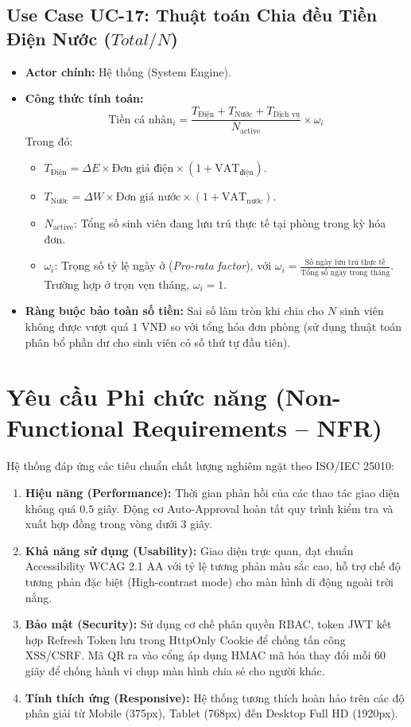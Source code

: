 \subsection{Use Case UC-17: Thuật toán Chia đều Tiền Điện Nước ($Total / N$)}
\begin{itemize}
    \item \textbf{Actor chính:} Hệ thống (System Engine).
    \item \textbf{Công thức tính toán:}
    \begin{equation}
        \text{Tiền cá nhân}_i = \frac{T_{\text{Điện}} + T_{\text{Nước}} + T_{\text{Dịch vụ}}}{N_{\text{active}}} \times \omega_i
    \end{equation}
    Trong đó:
    \begin{itemize}
        \item $T_{\text{Điện}} = \Delta E \times \text{Đơn giá điện} \times (1 + \text{VAT}_{\text{điện}})$.
        \item $T_{\text{Nước}} = \Delta W \times \text{Đơn giá nước} \times (1 + \text{VAT}_{\text{nước}})$.
        \item $N_{\text{active}}$: Tổng số sinh viên đang lưu trú thực tế tại phòng trong kỳ hóa đơn.
        \item $\omega_i$: Trọng số tỷ lệ ngày ở (\textit{Pro-rata factor}), với $\omega_i = \frac{\text{Số ngày lưu trú thực tế}}{\text{Tổng số ngày trong tháng}}$. Trường hợp ở trọn vẹn tháng, $\omega_i = 1$.
    \end{itemize}
    \item \textbf{Ràng buộc bảo toàn số tiền:} Sai số làm tròn khi chia cho $N$ sinh viên không được vượt quá $1$ VNĐ so với tổng hóa đơn phòng (sử dụng thuật toán phân bổ phần dư cho sinh viên có số thứ tự đầu tiên).
\end{itemize}

\section{Yêu cầu Phi chức năng (Non-Functional Requirements -- NFR)}
Hệ thống đáp ứng các tiêu chuẩn chất lượng nghiêm ngặt theo ISO/IEC 25010:
\begin{enumerate}
    \item \textbf{Hiệu năng (Performance):} Thời gian phản hồi của các thao tác giao diện không quá $0.5$ giây. Động cơ Auto-Approval hoàn tất quy trình kiểm tra và xuất hợp đồng trong vòng dưới $3$ giây.
    \item \textbf{Khả năng sử dụng (Usability):} Giao diện trực quan, đạt chuẩn Accessibility WCAG 2.1 AA với tỷ lệ tương phản màu sắc cao, hỗ trợ chế độ tương phản đặc biệt (High-contrast mode) cho màn hình di động ngoài trời nắng.
    \item \textbf{Bảo mật (Security):} Sử dụng cơ chế phân quyền RBAC, token JWT kết hợp Refresh Token lưu trong HttpOnly Cookie để chống tấn công XSS/CSRF. Mã QR ra vào cổng áp dụng HMAC mã hóa thay đổi mỗi 60 giây để chống hành vi chụp màn hình chia sẻ cho người khác.
    \item \textbf{Tính thích ứng (Responsive):} Hệ thống tương thích hoàn hảo trên các độ phân giải từ Mobile (375px), Tablet (768px) đến Desktop Full HD (1920px).
\end{enumerate}

